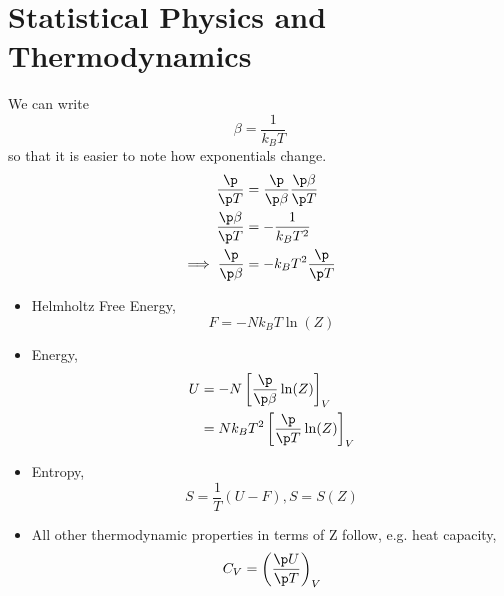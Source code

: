 \documentclass[a4paper, 11pt, normalem]{report}
\begin{document}
\section{Statistical Physics and Thermodynamics}
We can write
\begin{equation}
    \beta = \frac{1}{k_BT}
\end{equation}
so that it is easier to note how exponentials change.
\begin{align}
    \frac{\p}{\p T} &= \frac{\p}{\p\beta}\frac{\p\beta}{\p T} \\
    \frac{\p\beta}{\p T} &= -\frac{1}{k_BT^2} \\
    \implies \frac{\p}{\p\beta} &= -k_BT^2\frac{\p}{\p T}
\end{align}

\begin{itemize}
    \item Helmholtz Free Energy,
        \begin{equation}
            F = -Nk_BT\ln(Z)
        \end{equation}
    \item Energy,
        \begin{align}
            U &= -N\left[\frac{\p}{\p\beta}\ln(Z)\right]_V \\
              &= Nk_BT^2\left[\frac{\p}{\p T}\ln(Z)\right]_V
        \end{align}
    \item Entropy,
        \begin{equation}
            S = \frac{1}{T}(U-F), S = S(Z)
        \end{equation}
    \item All other thermodynamic properties in terms of Z follow, e.g. heat capacity,
        \begin{equation}
            C_V = \left(\frac{\p U}{\p T}\right)_V
        \end{equation}
\end{itemize}
\end{document}
